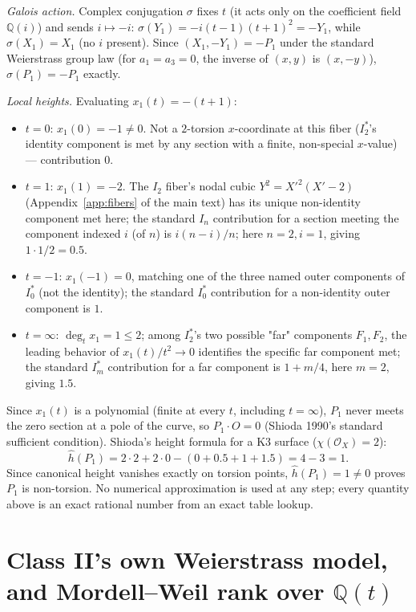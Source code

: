 \documentclass[11pt]{amsart}
\theoremstyle{definition}
\newcommand{\Q}{\mathbb{Q}}
\begin{document}
\emph{Galois action.} Complex conjugation $\sigma$ fixes $t$ (it acts only on the coefficient field $\Q(i)$) and sends $i\mapsto-i$: $\sigma(Y_1)=-i(t-1)(t+1)^2=-Y_1$, while $\sigma(X_1)=X_1$ (no $i$ present). Since $(X_1,-Y_1)=-P_1$ under the standard Weierstrass group law (for $a_1=a_3=0$, the inverse of $(x,y)$ is $(x,-y)$), $\sigma(P_1)=-P_1$ exactly.

\emph{Local heights.} Evaluating $x_1(t)=-(t+1)$:
\begin{itemize}
\item $t=0$: $x_1(0)=-1\ne0$. Not a $2$-torsion $x$-coordinate at this fiber ($I_2^*$'s identity component is met by any section with a finite, non-special $x$-value) — contribution $0$.
\item $t=1$: $x_1(1)=-2$. The $I_2$ fiber's nodal cubic $Y^2=X'^2(X'-2)$ (Appendix~\ref{app:fibers} of the main text) has its unique non-identity component met here; the standard $I_n$ contribution for a section meeting the component indexed $i$ (of $n$) is $i(n-i)/n$; here $n=2,i=1$, giving $1\cdot1/2=0.5$.
\item $t=-1$: $x_1(-1)=0$, matching one of the three named outer components of $I_0^*$ (not the identity); the standard $I_0^*$ contribution for a non-identity outer component is $1$.
\item $t=\infty$: $\deg_tx_1=1\le2$; among $I_2^*$'s two possible "far" components $F_1,F_2$, the leading behavior of $x_1(t)/t^2\to0$ identifies the specific far component met; the standard $I_m^*$ contribution for a far component is $1+m/4$, here $m=2$, giving $1.5$.
\end{itemize}
Since $x_1(t)$ is a polynomial (finite at every $t$, including $t=\infty$), $P_1$ never meets the zero section at a pole of the curve, so $P_1\cdot O=0$ (Shioda 1990's standard sufficient condition). Shioda's height formula for a K3 surface ($\chi(\mathcal O_X)=2$):
\[
\hat h(P_1) = 2\cdot2+2\cdot0-(0+0.5+1+1.5) = 4-3 = 1.
\]
Since canonical height vanishes exactly on torsion points, $\hat h(P_1)=1\ne0$ proves $P_1$ is non-torsion. No numerical approximation is used at any step; every quantity above is an exact rational number from an exact table lookup.

\section{Class II's own Weierstrass model, and Mordell--Weil rank over \texorpdfstring{$\Q(t)$}{Q(t)}}
\label{app:class2}
\end{document}
